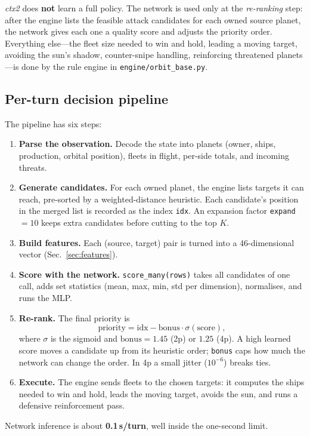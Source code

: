 \documentclass[conference]{IEEEtran}
\begin{document}
\textit{ctx2} does \textbf{not} learn a full policy. The network is used only at the \textit{re-ranking} step: after the engine lists the feasible attack candidates for each owned source planet, the network gives each one a quality score and adjusts the priority order. Everything else---the fleet size needed to win and hold, leading a moving target, avoiding the sun's shadow, counter-snipe handling, reinforcing threatened planets---is done by the rule engine in \texttt{engine/orbit\_base.py}.

\subsection{Per-turn decision pipeline}

The pipeline has six steps:
\begin{enumerate}
\item \textbf{Parse the observation.} Decode the state into planets (owner, ships, production, orbital position), fleets in flight, per-side totals, and incoming threats.
\item \textbf{Generate candidates.} For each owned planet, the engine lists targets it can reach, pre-sorted by a weighted-distance heuristic. Each candidate's position in the merged list is recorded as the index \texttt{idx}. An expansion factor \texttt{expand}~$=10$ keeps extra candidates before cutting to the top $K$.
\item \textbf{Build features.} Each (source, target) pair is turned into a 46-dimensional vector (Sec.~\ref{sec:features}).
\item \textbf{Score with the network.} \texttt{score\_many(rows)} takes all candidates of one call, adds set statistics (mean, max, min, std per dimension), normalises, and runs the MLP.
\item \textbf{Re-rank.} The final priority is
\begin{equation}
\label{eq:priority}
\mathrm{priority} = \mathrm{idx} - \mathrm{bonus} \cdot \sigma(\mathrm{score}),
\end{equation}
where $\sigma$ is the sigmoid and $\mathrm{bonus} = 1.45$ (2p) or $1.25$ (4p). A high learned score moves a candidate up from its heuristic order; \texttt{bonus} caps how much the network can change the order. In 4p a small jitter ($10^{-6}$) breaks ties.
\item \textbf{Execute.} The engine sends fleets to the chosen targets: it computes the ships needed to win and hold, leads the moving target, avoids the sun, and runs a defensive reinforcement pass.
\end{enumerate}
Network inference is about \textbf{0.1\,s/turn}, well inside the one-second limit.
\end{document}
